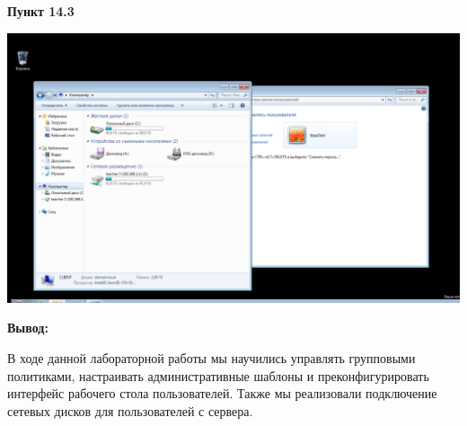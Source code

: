 \documentclass[a4paper,14pt]{extarticle}
\begin{document}
    \textbf{Пункт 14.3}
    \begin{center}
        \includegraphics[scale=0.4]{14.3}
    \end{center}

    \textbf{Вывод:}

    В ходе данной лабораторной работы мы научились управлять групповыми 
    политиками, настраивать административные шаблоны и преконфигурировать
    интерфейс рабочего стола пользователей. Также мы реализовали 
    подключение сетевых дисков для пользователей с сервера.
\end{document}
